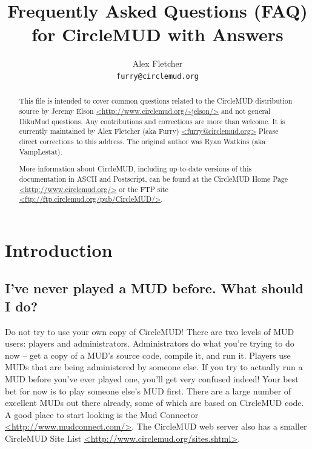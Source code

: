 \documentclass[11pt]{article}
\title{Frequently Asked Questions (FAQ) for CircleMUD with Answers}
\author{Alex Fletcher\\
\texttt{furry@circlemud.org}}
\begin{document}
\maketitle

\begin{abstract}
This file is intended to cover common questions related to the CircleMUD distribution source by
Jeremy Elson \url{<http://www.circlemud.org/~jelson/>} and not general DikuMud questions.  Any contributions and corrections are more than welcome.  It is currently maintained by Alex Fletcher (aka Furry) \url{<furry@circlemud.org>} Please direct corrections to this address.  The original author was Ryan Watkins (aka VampLestat).\par
More information about CircleMUD, including up-to-date versions of this documentation in ASCII and Postscript, can be found at the CircleMUD Home Page \url{<http://www.circlemud.org/>} or the FTP site \url{<ftp://ftp.circlemud.org/pub/CircleMUD/>}.
\end{abstract}

\tableofcontents

\section{Introduction}
\subsection{I've never played a MUD before.  What should I do?}
Do not try to use your own copy of CircleMUD! There are two levels of MUD users: players and administrators.  Administrators do what you're trying to do now -- get a copy of a MUD's source code, compile it, and run it. Players use MUDs that are being administered by someone else.  If you try to actually run a MUD before you've ever played one, you'll get very confused indeed! Your best bet for now is to play someone else's MUD first.  There are a large number of excellent MUDs out there already, some of which are based on CircleMUD code.  A good place to start looking is the Mud Connector \url{<http://www.mudconnect.com/>}. The CircleMUD web server also has a smaller CircleMUD Site List \url{<http://www.circlemud.org/sites.shtml>}.
\end{document}
